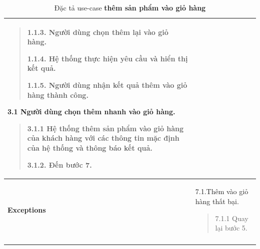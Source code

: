 {\begin{longtable}{| p{} | p{} |}
\begin{quote}
            1.1.3. Người dùng chọn thêm lại vào giỏ hàng.
            
            1.1.4. Hệ thống thực hiện yêu cầu và hiển thị kết quả.
            
            1.1.5. Người dùng nhận kết quả thêm vào giỏ hàng thành công.
        
        \end{quote}
        3.1 Người dùng chọn thêm nhanh vào giỏ hàng.
        \begin{quote}
            3.1.1 Hệ thống thêm sản phẩm vào giỏ hàng của khách hàng với các thông tin mặc định của hệ thống và thông báo kết quả.
            
            3.1.2. Đến bước 7.
        \end{quote} 
    \\
    \hline
    \begin{flushleft}
        \textbf{Exceptions} 
    \end{flushleft}
    &
    7.1.Thêm vào giỏ hàng thất bại.
        \begin{quote}
            7.1.1 Quay lại bước 5.
        \end{quote}
    \\
    \hline
    \caption{Đặc tả use-case \textbf{thêm sản phẩm vào giỏ hàng}}
    \end{longtable}
    }


